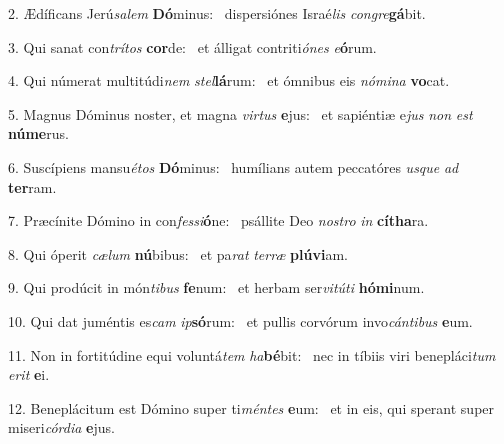 2. Ædíficans Jerú\textit{sa}\textit{lem} \textbf{Dó}minus: \ast\  dispersiónes Israé\textit{lis} \textit{con}\textit{gre}\textbf{gá}bit.\

3. Qui sanat con\textit{trí}\textit{tos} \textbf{cor}de: \ast\  et álligat contriti\textit{ó}\textit{nes} \textit{e}\textbf{ó}rum.\

4. Qui númerat multitúdi\textit{nem} \textit{stel}\textbf{lá}rum: \ast\  et ómnibus eis \textit{nó}\textit{mi}\textit{na} \textbf{vo}cat.\

5. Magnus Dóminus noster, et magna \textit{vir}\textit{tus} \textbf{e}jus: \ast\  et sapiéntiæ e\textit{jus} \textit{non} \textit{est} \textbf{nú}\textbf{me}rus.\

6. Suscípiens mansu\textit{é}\textit{tos} \textbf{Dó}minus: \ast\  humílians autem peccatóres \textit{us}\textit{que} \textit{ad} \textbf{ter}ram.\

7. Præcínite Dómino in con\textit{fes}\textit{si}\textbf{ó}ne: \ast\  psállite Deo \textit{nos}\textit{tro} \textit{in} \textbf{cí}\textbf{tha}ra.\

8. Qui óperit \textit{cæ}\textit{lum} \textbf{nú}bibus: \ast\  et pa\textit{rat} \textit{ter}\textit{ræ} \textbf{plú}\textbf{vi}am.\

9. Qui prodúcit in món\textit{ti}\textit{bus} \textbf{fe}num: \ast\  et herbam ser\textit{vi}\textit{tú}\textit{ti} \textbf{hó}\textbf{mi}num.\

10. Qui dat juméntis es\textit{cam} \textit{ip}\textbf{só}rum: \ast\  et pullis corvórum invo\textit{cán}\textit{ti}\textit{bus} \textbf{e}um.\

11. Non in fortitúdine equi voluntá\textit{tem} \textit{ha}\textbf{bé}bit: \ast\  nec in tíbiis viri benepláci\textit{tum} \textit{e}\textit{rit} \textbf{e}i.\

12. Beneplácitum est Dómino super ti\textit{mén}\textit{tes} \textbf{e}um: \ast\  et in eis, qui sperant super miseri\textit{cór}\textit{di}\textit{a} \textbf{e}jus.\

